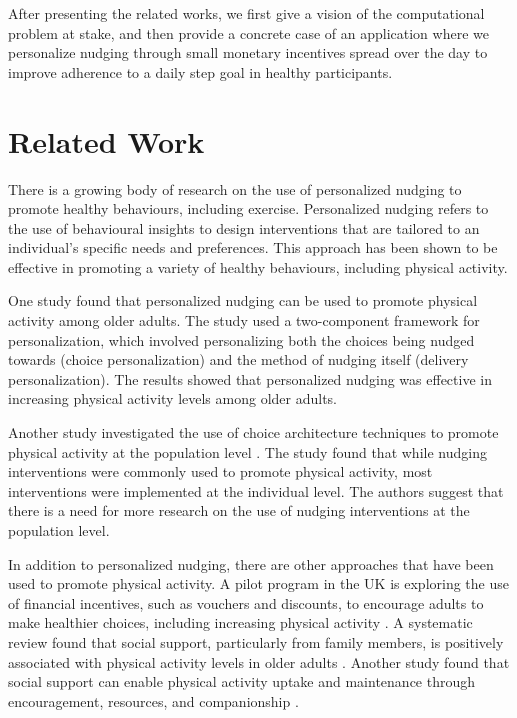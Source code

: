 \documentclass[manuscript,screen,review]{acmart}
\begin{document}
After presenting the related works, we first give a vision of the computational problem at stake, and then
provide a concrete case of an application where we personalize nudging through small monetary incentives spread over the day to improve adherence to a daily step goal in healthy participants.


\section{Related Work}

There is a growing body of research on the use of personalized nudging to promote healthy behaviours, including exercise.
Personalized nudging refers to the use of behavioural insights to design interventions that are tailored to an individual’s
specific needs and preferences\cite{mills_2022}. This approach has been shown to be effective in promoting a variety
of healthy behaviours, including physical activity\cite{forberger2019nudging}.

One study found that personalized nudging can be used to promote physical activity among older
adults\cite{room2017interventions}. The study used a two-component framework for personalization, which involved
personalizing both the choices being nudged towards (choice personalization) and the method of nudging itself
(delivery personalization). The results showed that personalized nudging was effective in increasing physical activity levels among older adults.

Another study investigated the use of choice architecture techniques to promote physical activity at the population
level \cite{forberger2019nudging}. The study found that while nudging interventions were commonly used to promote
physical activity, most interventions were implemented at the individual level. The authors suggest that there is a need for more research on the use of nudging interventions at the population level.

In addition to personalized nudging, there are other approaches that have been used to promote physical activity. A
pilot program in the UK is exploring the use of financial incentives, such as vouchers and discounts, to encourage
adults to make healthier choices, including increasing physical activity \cite{govuk2021}.
A systematic review found that social support, particularly from family members, is positively associated with
physical activity levels in older adults \cite{lindsay2017association}. Another study found that social support can enable physical activity
uptake and maintenance through encouragement, resources, and companionship \cite{smith2023relationship}.
\end{document}
